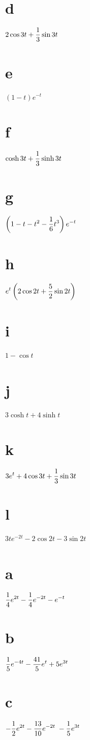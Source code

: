 \quad\;
\part{d} $\displaystyle{2\cos3t+\frac{1}{3}\sin3t}$\;
 \part{e} $(1-t)e^{-t}$\;
\part{f} $\displaystyle{\cosh3t+\frac{1}{3}\sinh3t}$\;
 \part{g} $\displaystyle{\left(1-t-t^{2}-\frac{1}{6}
t^{3}\right)e^{-t}}$\;

\quad\;
\part{h} $\displaystyle{e^{t}\left(2\cos2t+\frac{5}{2}\sin2t\right)}$\;
 \part{i} $1-\cos t$\;
\part{j} $3\cosh t+4\sinh t$\;
 \part{k} $\displaystyle{3e^{t}+4\cos3t+\frac{1}{3}\sin3t}$\;

\quad\;
\part{l} $3te^{-2t}-2\cos2t-3\sin2t$

\smallskip
{}
\part{a} $\displaystyle{\frac{1}{4}e^{2t}-
\frac{1}{4}e^{-2t}-e^{-t}}$\;
\part{b}  $\displaystyle{\frac{1}{5}e^{-4t}-\frac{41}{5}e^{t}+5e^{3t}}$\;
 \part{c} $\displaystyle{-\frac{1}{2}e^{2t}-\frac{13}{10}e^{-2t}\;
-\frac{1}{5}e^{3t}}$\;

